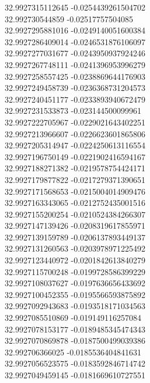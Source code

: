 {32.9927315112645	-0.0254439261504702\\
32.992730544859	-0.02517757504085\\
32.9927295881016	-0.0249140051600384\\
32.9927286409014	-0.0246531876106097\\
32.9927277031677	-0.0243950937924246\\
32.9927267748111	-0.0241396953996279\\
32.9927258557425	-0.0238869644176903\\
32.9927249458739	-0.0236368731204573\\
32.9927240451177	-0.0233893940672479\\
32.9927231533873	-0.023144500099961\\
32.9927222705967	-0.0229021643402251\\
32.9927213966607	-0.0226623601865806\\
32.9927205314947	-0.0224250613116554\\
32.9927196750149	-0.0221902416594167\\
32.9927188271382	-0.0219578754424171\\
32.9927179877822	-0.0217279371390651\\
32.9927171568653	-0.0215004014909476\\
32.9927163343065	-0.0212752435001516\\
32.9927155200254	-0.0210524384266307\\
32.9927147139426	-0.0208319617855971\\
32.9927139159789	-0.0206137893449137\\
32.9927131260563	-0.0203978971225492\\
32.9927123440972	-0.0201842613840279\\
32.9927115700248	-0.0199728586399229\\
32.9927108037627	-0.0197636656433692\\
32.9927100452355	-0.0195566593875892\\
32.9927092943683	-0.0193518171034563\\
32.9927085510869	-0.019149116257084\\
32.9927078153177	-0.0189485345474343\\
32.9927070869878	-0.0187500499039386\\
32.992706366025	-0.0185536404841631\\
32.9927056523575	-0.0183592846714742\\
32.9927049459145	-0.0181669610727551\\
}
